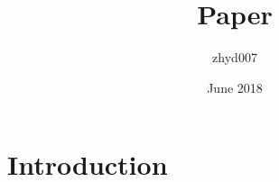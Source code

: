 \documentclass{article}
\title{Paper}
\author{zhyd007 }
\date{June 2018}
\begin{document}
\maketitle

\section{Introduction}
\end{document}
